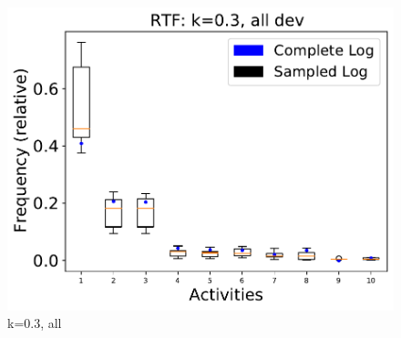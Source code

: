 \documentclass[landscape]{article}
\begin{document}
\begin{figure}[!htb]
	\hfill
	\begin{minipage}{0.2\textwidth}
		\includegraphics[width=1.0\textwidth]{../Road_Traffic_Fines_Management_Process/Road_Traffic_Fines_Management_Process_deviationsApprox_0.3_NONALIGNING_ALL.pdf}
		\caption{k=0.3, all}
	\end{minipage}
\end{figure}
\newpage
\end{document}
